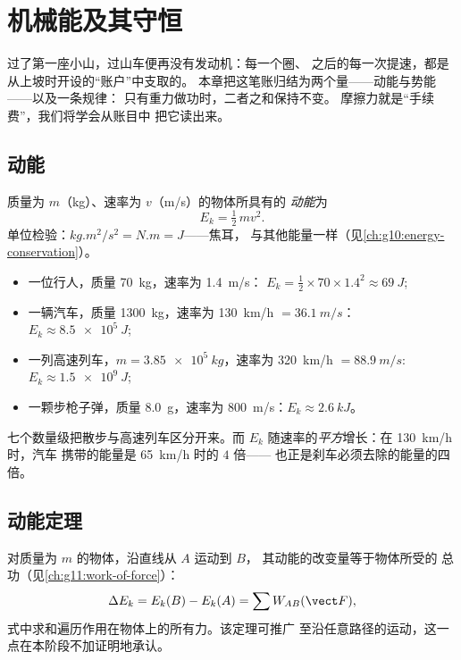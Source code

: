 \chapter{机械能及其守恒}\label{ch:g11:mechanical-energy}

过了第一座小山，过山车便再没有发动机：每一个圈、
之后的每一次提速，都是从上坡时开设的“账户”中支取的。
本章把这笔账归结为两个量——动能与势能——以及一条规律：
只有重力做功时，二者之和保持不变。
摩擦力就是“手续费”，我们将学会从账目中
把它读出来。

\section{动能}

\begin{definition}[动能]\label{def:g11:mechanical-energy:kinetic}
质量为 $m$（\unit{kg}）、速率为 $v$（\unit{m/s}）的物体所具有的
\emph{动能}为
\[
E_k = \tfrac12\, m v^2 .
\]
单位检验：$\unit{kg.m^2/s^2} = \unit{N.m} = \unit{J}$——焦耳，
与其他能量一样（见\cref{ch:g10:energy-conservation}）。
\end{definition}

\begin{example}[数量级]\label{ex:g11:mechanical-energy:orders}
\begin{itemize}
  \item 一位行人，质量 \qty{70}{kg}，速率为 \qty{1.4}{m/s}：
        $E_k = \tfrac12 \times 70 \times 1.4^2 \approx \qty{69}{J}$;
  \item 一辆汽车，质量 \qty{1300}{kg}，速率为 \qty{130}{km/h} $= \qty{36.1}{m/s}$：
        $E_k \approx \qty{8.5e5}{J}$;
  \item 一列高速列车，$m = \qty{3.85e5}{kg}$，速率为 \qty{320}{km/h}
        $= \qty{88.9}{m/s}$: $E_k \approx \qty{1.5e9}{J}$;
  \item 一颗步枪子弹，质量 \qty{8.0}{g}，速率为 \qty{800}{m/s}：$E_k \approx \qty{2.6}{kJ}$。
\end{itemize}
七个数量级把散步与高速列车区分开来。而 $E_k$
随速率的\emph{平方}增长：在 \qty{130}{km/h} 时，汽车
携带的能量是 \qty{65}{km/h} 时的 $4$ 倍——
也正是刹车必须去除的能量的四倍。
\end{example}

\section{动能定理}

\begin{theorem}[动能定理]\label{thm:g11:mechanical-energy:ketheorem}
对质量为 $m$ 的物体，沿直线从 $A$ 运动到 $B$，
其动能的改变量等于物体所受的
总功（见\cref{ch:g11:work-of-force}）：
\[
\Delta E_k = E_k(B) - E_k(A) = \sum W_{AB}(\vect F),
\]
式中求和遍历作用在物体上的所有力。该定理可推广
至沿任意路径的运动，这一点在本阶段不加证明地承认。
\end{theorem}
\admitted

